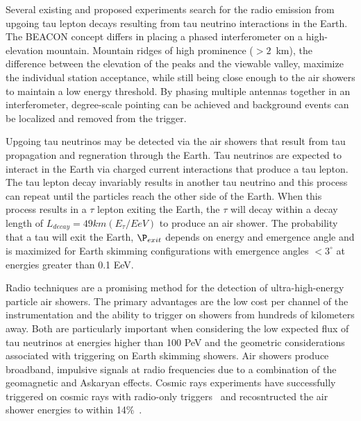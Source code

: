 \documentclass{PoS}
\begin{document}
Several existing and proposed experiments search for the radio emission from  upgoing tau lepton decays resulting from tau neutrino interactions in the Earth\cite{Auger, GRAND, Trinity, POEMMA}. The BEACON concept differs in placing a phased interferometer on a high-elevation mountain. Mountain ridges of high prominence ($>2$~km), the difference between the elevation of the peaks and the viewable valley, maximize the individual station acceptance, while still being close enough to the air showers to maintain a low energy threshold. By phasing multiple antennas together in an interferometer, degree-scale pointing can be achieved and background events can be localized and removed from the trigger.

Upgoing tau neutrinos may be detected via the air showers that result from tau propagation and regneration through the Earth. Tau neutrinos are expected to interact in the Earth via charged current interactions that produce a tau lepton.%
The tau lepton decay invariably results in another tau neutrino and this process can repeat until the particles reach the other side of the Earth. When this process results in a $\tau$ lepton exiting the Earth, the $\tau$ will decay within a decay length of $L_{decay} = 49 km (E_\tau/EeV)$ to produce an air shower. The probability that a tau will exit the Earth, $\P_{exit}$ depends on energy and emergence angle and is maximized for Earth skimming configurations with emergence angles $<3^{\circ}$ at energies greater than 0.1 EeV. 

Radio techniques are a promising method for the detection of ultra-high-energy particle air showers. The primary advantages are the low cost per channel of the instrumentation and the ability to trigger on showers from hundreds of kilometers away. Both are particularly important when considering the low expected flux of tau neutrinos at energies higher than 100 PeV and the geometric considerations associated with triggering on Earth skimming showers. Air showers produce broadband, impulsive signals at radio frequencies due to a combination of the geomagnetic and Askaryan effects. Cosmic rays experiments have successfully triggered on cosmic rays with radio-only triggers~\cite{TREND, OVRO-LWA} and recosntructed the air shower energies to within 14\%~\cite{AERA}.
\end{document}
